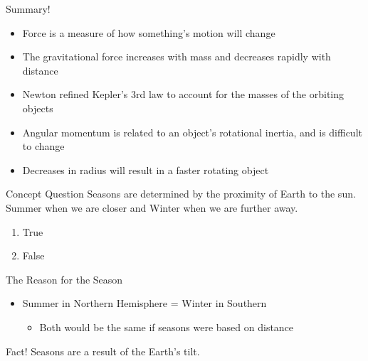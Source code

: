 \documentclass[pdf, aspectratio=169]{beamer}
\begin{document}
\begin{frame}{Summary!}
  \begin{itemize}
	  \item Force is a measure of how something's motion will change
	  \item The gravitational force increases with mass and decreases rapidly with distance
	  \item Newton refined Kepler's 3rd law to account for the masses of the orbiting objects
	  \item Angular momentum is related to an object's rotational inertia, and is difficult to change
	  \item Decreases in radius will result in a faster rotating object
  \end{itemize}
\end{frame}


\begin{frame}{Concept Question}
  Seasons are determined by the proximity of Earth to the sun. Summer when we are closer and Winter when we are further away.
  \begin{enumerate}
	\item True
	\item False
  \end{enumerate}
\end{frame}

\begin{frame}{The Reason for the Season}
  \begin{itemize}
	\item Summer in Northern Hemisphere = Winter in Southern
	  \begin{itemize}
		\item Both would be the same if seasons were based on distance
	  \end{itemize}
  \end{itemize}
  \pause
  \begin{alertblock}{Fact!}
	Seasons are a result of the Earth's tilt.
  \end{alertblock}
\end{frame}
\end{document}
